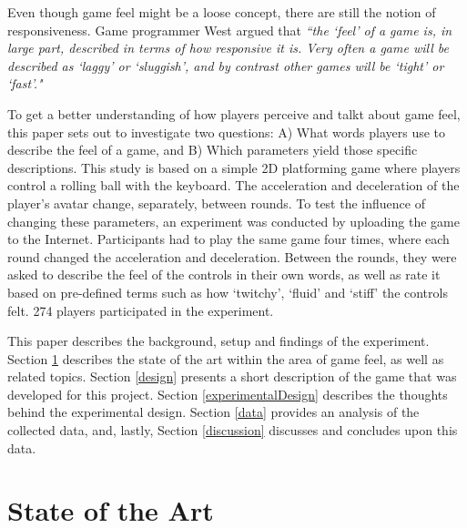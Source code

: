 Even though game feel might be a loose concept, there are still the notion of responsiveness. Game programmer West argued that \textit{``the `feel' of a game is, in large part, described in terms of how responsive it is. Very often a game will be described as `laggy' or `sluggish', and by contrast other games will be `tight' or `fast'."} \cite{measure_lag} 

To get a better understanding of how players perceive and talkt about game feel, this paper sets out to investigate two questions: A) What words players use to describe the feel of a game, and B) Which parameters yield those specific descriptions. This study is based on a simple 2D platforming game where players control a rolling ball with the keyboard. The acceleration and deceleration of the player's avatar change, separately, between rounds. To test the influence of changing these parameters, an experiment was conducted by uploading the game to the Internet. Participants had to play the same game four times, where each round changed the acceleration and deceleration. Between the rounds, they were asked to describe the feel of the controls in their own words, as well as rate it based on pre-defined terms such as how `twitchy', `fluid' and `stiff' the controls felt. 274 players participated in the experiment.


This paper describes the background, setup and findings of the experiment. Section \ref{stateOfTheArt} describes the state of the art within the area of game feel, as well as related topics. Section \ref{design} presents a short description of the game that was developed for this project. Section \ref{experimentalDesign} describes the thoughts behind the experimental design. Section \ref{data} provides an analysis of the collected data, and, lastly, Section \ref{discussion} discusses and concludes upon this data.

\section{State of the Art} \label{stateOfTheArt}

